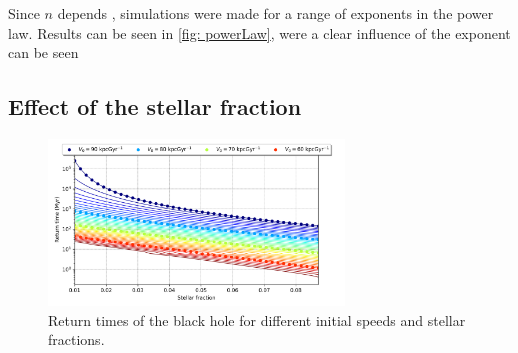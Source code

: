 		Since $n$ depends , simulations were made for a range of exponents in the power law. Results can be seen in \autoref{fig: powerLaw}, were a clear influence of the exponent can be seen
	
	\subsection{Effect of the stellar fraction}
	\begin{figure}[h]
		\centering
		\includegraphics[width = 0.7\textwidth]{"../Files/Week 10/returntimes_stellar_speed"}
		\caption{Return times of the black hole for different initial speeds and stellar fractions.}
		\label{fig: stellarfraction}
	\end{figure}

